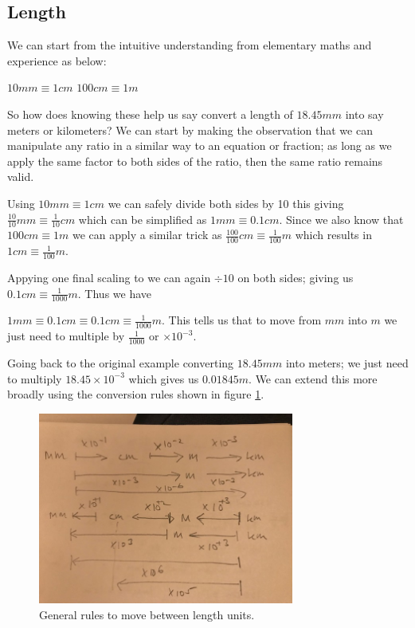 \subsection{Length}

We can start from the intuitive understanding from elementary maths and experience as below: 

$ 10mm \equiv 1 cm $
$ 100cm \equiv 1m $

So how does knowing these help us say convert a length of $18.45 mm$ into say meters or kilometers?  We can start by making the observation that we can manipulate any ratio in a similar way to an equation or fraction; as long as we apply the same factor to both sides of the ratio, then the same ratio remains valid. 


Using $ 10mm \equiv 1 cm $ we can safely divide both sides by 10 this giving $ \frac{10}{10}mm \equiv \frac{1}{10} cm $ which can be simplified as $ 1mm \equiv 0.1 cm $. Since we also know that $ 100cm \equiv 1m $ we can apply a similar trick as $ \frac{100}{100}cm \equiv \frac{1}{100}m $ which results in $ 1cm \equiv \frac{1}{100}m $.

Appying one final scaling to we can again $ \div 10 $ on both sides; giving us $ 0.1cm \equiv \frac{1}{1000}m $. Thus we have

$ 1mm \equiv 0.1 cm  \equiv 0.1cm \equiv \frac{1}{1000}m $. This tells us that to move from $mm$ into $m$ we just need to multiple by $\frac{1}{1000}$ or $ \times 10^{-3}$. 

Going back to the original example converting  $18.45 mm$ into meters; we just need to multiply  $18.45 \times 10^{-3} $ which gives us $0.01845 m $. We can extend this more broadly using the conversion rules shown in figure \ref{fig:convert0}.

\begin{figure}[h]
    \centering
    \includegraphics[width=0.75\textwidth]{IMG_2968}
    \caption{General rules to move between length units.}
    \label{fig:convert0}
\end{figure}

